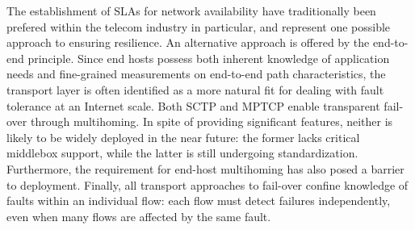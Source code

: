The establishment of SLAs for network availability have traditionally been prefered within the telecom industry in particular, and represent one possible approach to ensuring resilience. An alternative approach is offered by the end-to-end principle. 
Since end hosts possess both inherent knowledge of application needs and fine-grained measurements on end-to-end path characteristics, the transport layer is often identified as a more natural fit for dealing with fault tolerance at an Internet scale.
Both SCTP \cite{} and MPTCP \cite{} enable transparent fail-over through multihoming.
In spite of providing significant features, neither is likely to be widely deployed in the near future: the former lacks critical middlebox support, while the latter is still undergoing standardization.
Furthermore, the requirement for end-host multihoming has also posed a barrier to deployment.
Finally, all transport approaches to fail-over confine knowledge of faults within an individual flow: each flow must detect failures independently, even when many flows are affected by the same fault.












